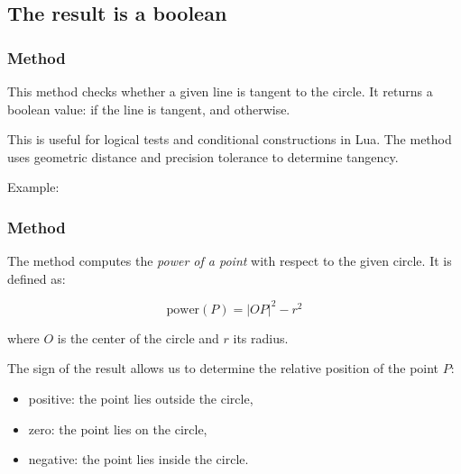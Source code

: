\subsection{The result is a boolean}

\subsubsection{Method }
\label{ssub:method_circle_is__tangent}

This method checks whether a given line is tangent to the circle. It returns a boolean value:  if the line is tangent, and  otherwise.

\medskip
\noindent
This is useful for logical tests and conditional constructions in Lua. The method uses geometric distance and precision tolerance to determine tangency.

\medskip
\noindent
Example:

\begin{tkzexample}[latex=.5\textwidth]
\end{tkzexample}

 \subsubsection{Method }
 \label{ssub:power}

 The  method computes the \emph{power of a point} with respect to the given circle. It is defined as:

 \[
 \text{power}(P) = |OP|^2 - r^2
 \]

 where $O$ is the center of the circle and $r$ its radius.

 \medskip
 \noindent
 The sign of the result allows us to determine the relative position of the point $P$:
 \begin{itemize}
   \item positive: the point lies outside the circle,
   \item zero: the point lies on the circle,
   \item negative: the point lies inside the circle.
 \end{itemize}

